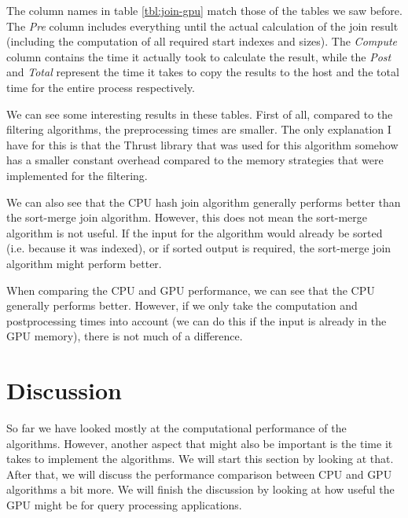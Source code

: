 \documentclass[a4paper,titlepage]{article}
\begin{document}
The column names in table \ref{tbl:join-gpu} match those of the tables we saw before. The \emph{Pre} column includes everything until the actual calculation of the join result (including the computation of all required start indexes and sizes). The \emph{Compute} column contains the time it actually took to calculate the result, while the \emph{Post} and \emph{Total} represent the time it takes to copy the results to the host and the total time for the entire process respectively.

We can see some interesting results in these tables. First of all, compared to the filtering algorithms, the preprocessing times are smaller. The only explanation I have for this is that the Thrust library that was used for this algorithm somehow has a smaller constant overhead compared to the memory strategies that were implemented for the filtering. 

We can also see that the CPU hash join algorithm generally performs better than the sort-merge join algorithm. However, this does not mean the sort-merge algorithm is not useful. If the input for the algorithm would already be sorted (i.e. because it was indexed), or if sorted output is required, the sort-merge join algorithm might perform better.

When comparing the CPU and GPU performance, we can see that the CPU generally performs better. However, if we only take the computation and postprocessing times into account (we can do this if the input is already in the GPU memory), there is not much of a difference.

\section{Discussion}
\label{sec:discussion}
So far we have looked mostly at the computational performance of the algorithms. However, another aspect that might also be important is the time it takes to implement the algorithms. We will start this section by looking at that. After that, we will discuss the performance comparison between CPU and GPU algorithms a bit more. We will finish the discussion by looking at how useful the GPU might be for query processing applications.
\end{document}
